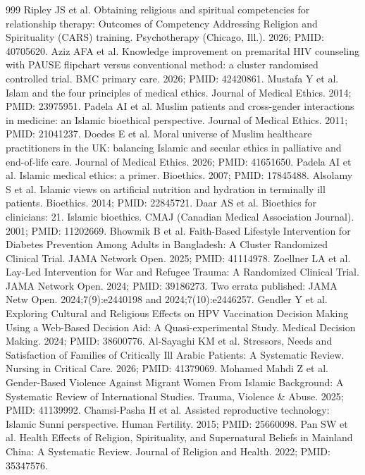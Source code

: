 \begin{thebibliography}{999}
 Ripley JS et al. Obtaining religious and spiritual competencies for relationship therapy: Outcomes of Competency Addressing Religion and Spirituality (CARS) training. Psychotherapy (Chicago, Ill.). 2026; PMID: 40705620.
 Aziz AFA et al. Knowledge improvement on premarital HIV counseling with PAUSE flipchart versus conventional method: a cluster randomised controlled trial. BMC primary care. 2026; PMID: 42420861.
 Mustafa Y et al. Islam and the four principles of medical ethics. Journal of Medical Ethics. 2014; PMID: 23975951.
 Padela AI et al. Muslim patients and cross-gender interactions in medicine: an Islamic bioethical perspective. Journal of Medical Ethics. 2011; PMID: 21041237.
 Doedes E et al. Moral universe of Muslim healthcare practitioners in the UK: balancing Islamic and secular ethics in palliative and end-of-life care. Journal of Medical Ethics. 2026; PMID: 41651650.
 Padela AI et al. Islamic medical ethics: a primer. Bioethics. 2007; PMID: 17845488.
 Alsolamy S et al. Islamic views on artificial nutrition and hydration in terminally ill patients. Bioethics. 2014; PMID: 22845721.
 Daar AS et al. Bioethics for clinicians: 21. Islamic bioethics. CMAJ (Canadian Medical Association Journal). 2001; PMID: 11202669.
 Bhowmik B et al. Faith-Based Lifestyle Intervention for Diabetes Prevention Among Adults in Bangladesh: A Cluster Randomized Clinical Trial. JAMA Network Open. 2025; PMID: 41114978.
 Zoellner LA et al. Lay-Led Intervention for War and Refugee Trauma: A Randomized Clinical Trial. JAMA Network Open. 2024; PMID: 39186273. Two errata published: JAMA Netw Open. 2024;7(9):e2440198 and 2024;7(10):e2446257.
 Gendler Y et al. Exploring Cultural and Religious Effects on HPV Vaccination Decision Making Using a Web-Based Decision Aid: A Quasi-experimental Study. Medical Decision Making. 2024; PMID: 38600776.
 Al-Sayaghi KM et al. Stressors, Needs and Satisfaction of Families of Critically Ill Arabic Patients: A Systematic Review. Nursing in Critical Care. 2026; PMID: 41379069.
 Mohamed Mahdi Z et al. Gender-Based Violence Against Migrant Women From Islamic Background: A Systematic Review of International Studies. Trauma, Violence \& Abuse. 2025; PMID: 41139992.
 Chamsi-Pasha H et al. Assisted reproductive technology: Islamic Sunni perspective. Human Fertility. 2015; PMID: 25660098.
 Pan SW et al. Health Effects of Religion, Spirituality, and Supernatural Beliefs in Mainland China: A Systematic Review. Journal of Religion and Health. 2022; PMID: 35347576.

\end{thebibliography}

